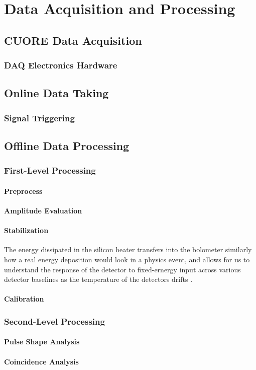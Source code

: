 \chapter{Data Acquisition and Processing}

\section{CUORE Data Acquisition}
\subsection{DAQ Electronics Hardware}

\section{Online Data Taking}
\subsection{Signal Triggering}

\section{Offline Data Processing}
\subsection{First-Level Processing}
\subsubsection{Preprocess}
\subsubsection{Amplitude Evaluation}
\subsubsection{Stabilization}
\label{ssec:Stabilization}

The energy dissipated in the silicon heater transfers into the bolometer similarly how a real energy deposition would look in a physics event, and allows for us to understand the response of the detector to fixed-ernergy input across various detector baselines as the temperature of the detectors drifts \cite{ALESSANDRELLO1998454:Si-heater}.

\subsubsection{Calibration}

\subsection{Second-Level Processing}
\subsubsection{Pulse Shape Analysis}
\subsubsection{Coincidence Analysis}



